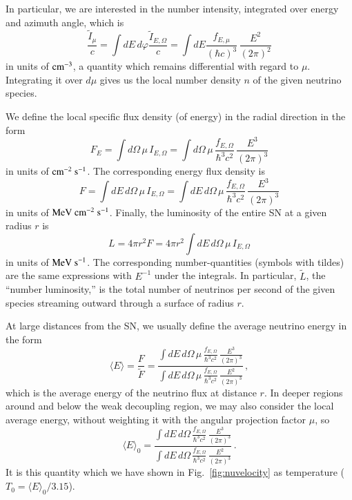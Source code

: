 \documentclass[iop,twocolappendix,numberedappendix]{emulateapj}
\begin{document}
In particular, we are interested in the number intensity, integrated over energy
and azimuth angle, which is
\begin{equation}
\label{eq:locdens}
\frac{\tilde I_\mu}{c}=\int dE\,d\varphi \frac{\tilde I_{E,\Omega}}{c}
=\int dE \frac{f_{E,\mu}}{(\hbar c)^3}\,\frac{E^2}{(2\pi)^2}
\end{equation}
in units of ${\rm cm}^{-3}$, a quantity which remains differential with regard to $\mu$.
Integrating it over $d\mu$ gives us the local number density $n$ of the given neutrino
species.


We define the local specific flux density (of energy) in the radial direction in the form
\begin{equation}
F_{E}=\int d\Omega\,\mu\,I_{E,\Omega}=
\int d\Omega\,\mu\,\frac{f_{E,\Omega}}{\hbar^3 c^2}\,\frac{E^3}{(2\pi)^3}
\end{equation}
in units of ${\rm cm}^{-2}~{\rm s}^{-1}$. The corresponding
energy flux density is
\begin{equation}
F=\int dE\,d\Omega\,\mu\,I_{E,\Omega}=
\int dE\,d\Omega\,\mu\,\frac{f_{E,\Omega}}{\hbar^3 c^2}\,\frac{E^3}{(2\pi)^3}
\end{equation}
in units of ${\rm MeV}~{\rm cm}^{-2}~{\rm s}^{-1}$. Finally, the luminosity
of the entire SN at a given radius $r$ is
\begin{equation}
\label{eq:luminosityint}
L=4\pi r^2 F=4\pi r^2
\int dE\,d\Omega\,\mu\,I_{E,\Omega}
\end{equation}
in units of ${\rm MeV}~{\rm s}^{-1}$. The corresponding number-quantities
(symbols with tildes) are the same expressions with $E^{-1}$ under the integrals.
In particular, $\tilde L$, the ``number luminosity,'' is the total number of
neutrinos per second of the given species streaming outward through a surface
of radius $r$.

At large distances from the SN, we usually define the average neutrino energy
in the form
\begin{equation}
\langle E\rangle = \frac{F}{\widetilde F}=
\frac{\int dE\,d\Omega\,\mu\,\frac{f_{E,\Omega}}{\hbar^3 c^2}\,\frac{E^3}{(2\pi)^3}}
{\int dE\,d\Omega\,\mu\,\frac{f_{E,\Omega}}{\hbar^3 c^2}\,\frac{E^2}{(2\pi)^3}}\,,
\label{eq:firstmom}
\end{equation}
which is the average energy of the neutrino flux at distance $r$. In deeper regions around
and below the weak decoupling region, we may also consider the
local average energy, without weighting it with the angular
projection factor $\mu$, so
\begin{equation}
\label{eq:firstmom0}
\langle E\rangle_0 =
\frac{\int dE\,d\Omega\,\frac{f_{E,\Omega}}{\hbar^3 c^2}\,\frac{E^3}{(2\pi)^3}}
{\int dE\,d\Omega\,\frac{f_{E,\Omega}}{\hbar^3 c^2}\,\frac{E^2}{(2\pi)^3}}\,.
\end{equation}
It is this quantity which we have shown in Fig.~\ref{fig:nuvelocity} as temperature ($T_0=
\langle
E\rangle_0/3.15$).
\end{document}

